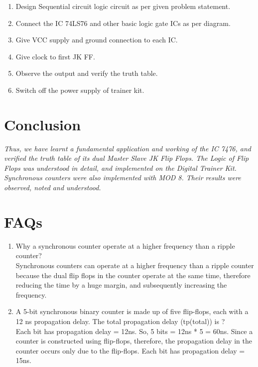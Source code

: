 \documentclass[11pt]{article}
\begin{document}
\begin{enumerate}
	\item Design Sequential circuit logic circuit as per given problem statement.
	\item Connect the IC 74LS76 and other basic logic gate ICs as per diagram.
	\item Give VCC supply and ground connection to each IC.
	\item Give clock to first JK FF.
	\item Observe the output and verify the truth table.
	\item Switch off the power supply of trainer kit.
\end{enumerate}

\section{Conclusion}
\textit{Thus, we have learnt a fundamental application and working of the IC 7476, and verified the truth table of its dual Master Slave JK Flip Flops. The Logic of Flip Flops was understood in detail, and implemented on the Digital Trainer Kit. Synchronous counters were also implemented with MOD 8. Their results were observed, noted and understood. }
\pagebreak

\section{FAQs}

\begin{enumerate}
	\item Why a synchronous counter operate at a higher frequency than a ripple counter? \\
	
	Synchronous counters can operate at a higher frequency than a ripple counter because the dual flip flops in the counter operate at the same time, therefore reducing the time by a huge margin, and subsequently increasing the frequency. 
	\item A 5-bit synchronous binary counter is made up of five flip-flops, each with a 12 ns propagation delay. The total propagation delay (tp(total)) is ?\\

	Each bit has propagation delay = 12ns. So, 5 bits = 12ns * 5 = 60ns. Since a counter is constructed using flip-flops, therefore, the propagation delay in the counter occurs only due to the flip-flops. Each bit has propagation delay = 15ns.
	


	
\end{enumerate}
\end{document}
